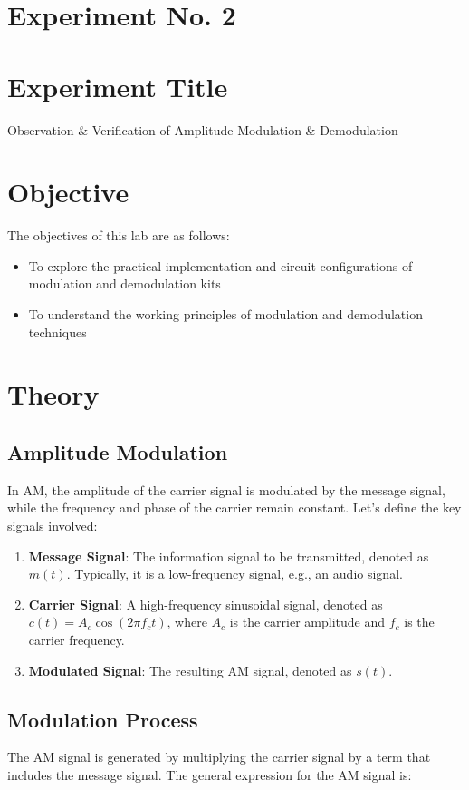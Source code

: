 \documentclass[a4paper,12pt]{article}
\begin{document}
	\section{Experiment No. 2}
	
	\section{Experiment Title }
	Observation \& Verification of Amplitude Modulation \& Demodulation
	\section{Objective}
	
	The objectives of this lab are as follows:
	\begin{itemize}
		\item To explore the practical implementation and circuit configurations of modulation and
		demodulation kits
		\item To understand the working principles of modulation and demodulation techniques
		
	\end{itemize}
	
	\section{Theory}


\subsection{Amplitude Modulation}
In AM, the amplitude of the carrier signal is modulated by the message signal, while the frequency and phase of the carrier remain constant. Let’s define the key signals involved:

\begin{enumerate}
	\item \textbf{Message Signal}: The information signal to be transmitted, denoted as \( m(t) \). Typically, it is a low-frequency signal, e.g., an audio signal.
	\item \textbf{Carrier Signal}: A high-frequency sinusoidal signal, denoted as \( c(t) = A_c \cos(2\pi f_c t) \), where \( A_c \) is the carrier amplitude and \( f_c \) is the carrier frequency.
	\item \textbf{Modulated Signal}: The resulting AM signal, denoted as \( s(t) \).
\end{enumerate}

\subsection{Modulation Process}
The AM signal is generated by multiplying the carrier signal by a term that includes the message signal. The general expression for the AM signal is:
\end{document}
